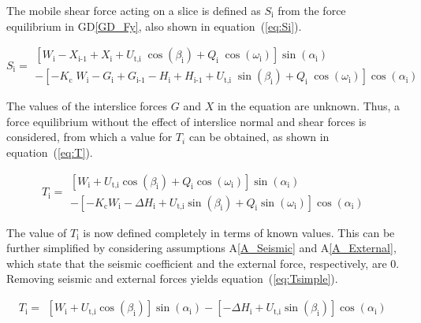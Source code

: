 \documentclass[12pt]{article}
\newcommand{\aref}[1]{A\ref{#1}}
\newcommand{\dref}[1]{GD\ref{#1}}
\begin{document}
\noindent
The mobile shear force acting on a slice is defined as $S_\text{i}$
from the force equilibrium in \dref{GD_Fy}, also shown in
equation~(\ref{eq:Si}).

\begin{equation}  \label{eq:Si}
  S_{\text{i}} = \begin{array}{l} \left[ W_{\text{i}} -X_{\text{i-1}}
      + X_{\text{i}} +
      {U_{\text{t,i}}}\;{\cos\left(\beta_{\text{i}}\right)} +
      Q_{\text{i}}\;{\cos\left(\omega_{\text{i}}\right)}
      \right]\sin\left(\alpha_{\text{i}}\right) \\ - \left[
      {-K_{\text{c}}}\;{W_{\text{i}}} - G_{\text{i}} + G_{\text{i-1}}
      - H_{\text{i}} + H_{\text{i-1}} +
      {U_{\text{t,i}}}\;{\sin\left(\beta_{\text{i}}\right)} +
      Q_{\text{i}}\;{\cos\left(\omega_{\text{i}}\right)}
      \right]\cos\left(\alpha_{\text{i}}\right) \end{array}
\end{equation}

\noindent
The values of the interslice forces $G$ and $X$ in the equation are
unknown. Thus, a force equilibrium without the effect of interslice normal and 
shear forces is considered, from which a value for $T_i$ can be obtained, as 
shown in equation~(\ref{eq:T}).

\begin{equation}  \label{eq:T} T_{\text{i}} =
  \begin{array}{l}  
\left[ W_{\text{i}} + U_{\text{t,i}} \cos\left(\beta_{\text{i}}\right)
  + Q_{\text{i}} \cos\left(\omega_{\text{i}}\right) \right]
\sin\left(\alpha_{\text{i}}\right) \\ - \left[ - K_{\text{c}}
  W_{\text{i}} - \Delta H_{\text{i}} + U_{\text{t,i}}
  \sin\left(\beta_{\text{i}}\right) + Q_{\text{i}}
  \sin\left(\omega_{\text{i}}\right) \right]
\cos\left(\alpha_{\text{i}}\right) \end{array}
\end{equation}

\noindent
The value of $T_\text{i}$ is now defined completely in terms of known values. 
This can be further simplified by considering assumptions \aref{A_Seismic} and 
\aref{A_External}, which state that the seismic coefficient and the external 
force, respectively, are 0. Removing seismic and external forces yields 
equation~(\ref{eq:Tsimple}).

\begin{equation}  \label{eq:Tsimple} T_{\text{i}} =
\begin{array}{l}  
\left[ W_{\text{i}} + U_{\text{t,i}} \cos\left(\beta_{\text{i}}\right) \right]
\sin\left(\alpha_{\text{i}}\right) - \left[ - \Delta H_{\text{i}} + 
U_{\text{t,i}}
\sin\left(\beta_{\text{i}}\right) \right]
\cos\left(\alpha_{\text{i}}\right) \end{array}
\end{equation}
\end{document}
